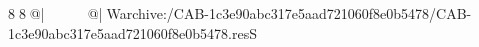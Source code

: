 8  8  @|                                                   @| W   archive:/CAB-1c3e90abc317e5aad721060f8e0b5478/CAB-1c3e90abc317e5aad721060f8e0b5478.resS 